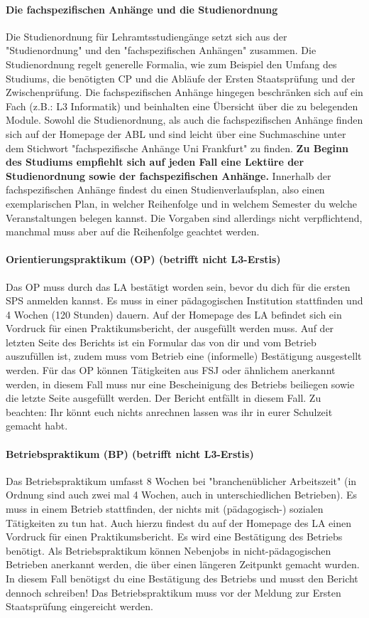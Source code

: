 \paragraph{Die fachspezifischen Anhänge und die Studienordnung}
Die Studienordnung für Lehramtsstudiengänge setzt sich aus der
"Studienordnung" und den "fachspezifischen Anhängen" zusammen. Die Studienordnung regelt generelle Formalia, wie zum Beispiel den Umfang des Studiums, die benötigten CP und die Abläufe der Ersten Staatsprüfung und der Zwischenprüfung.
Die fachspezifischen Anhänge hingegen beschränken sich auf ein Fach (z.B.: L3 Informatik) und beinhalten eine Übersicht über die zu belegenden Module.
Sowohl die Studienordnung, als auch die fachspezifischen Anhänge finden sich auf der Homepage der ABL und sind leicht über eine Suchmaschine unter dem Stichwort "fachspezifische Anhänge Uni Frankfurt" zu finden.
\textbf{Zu Beginn des Studiums empfiehlt sich auf jeden Fall eine Lektüre der Studienordnung sowie der fachspezifischen Anhänge.}
Innerhalb der fachspezifischen Anhänge findest du einen Studienverlaufsplan, also einen exemplarischen Plan, in welcher Reihenfolge und in welchem Semester du welche Veranstaltungen belegen kannst. Die Vorgaben sind allerdings nicht verpflichtend, manchmal muss aber auf die Reihenfolge geachtet werden.

\paragraph{Orientierungspraktikum (OP) (betrifft nicht L3-Erstis)} 
Das OP muss durch das LA bestätigt worden sein, bevor du dich für die ersten SPS anmelden kannst. Es muss in einer pädagogischen Institution stattfinden und 4 Wochen (120 Stunden) dauern. Auf der Homepage des LA befindet sich ein Vordruck für einen Praktikumsbericht, der ausgefüllt werden muss. Auf der letzten Seite des Berichts ist ein Formular das von dir und vom Betrieb auszufüllen ist, zudem muss vom Betrieb eine (informelle) Bestätigung ausgestellt werden.
Für das OP können Tätigkeiten aus FSJ oder ähnlichem anerkannt werden, in diesem Fall muss nur eine Bescheinigung des Betriebs beiliegen sowie die letzte Seite ausgefüllt werden. Der Bericht entfällt in diesem Fall.
Zu beachten: Ihr könnt euch nichts anrechnen lassen was ihr in eurer Schulzeit gemacht habt.

\paragraph{Betriebspraktikum (BP) (betrifft nicht L3-Erstis)}
Das Betriebspraktikum umfasst 8 Wochen bei "branchenüblicher Arbeitszeit" (in Ordnung sind auch zwei mal 4 Wochen, auch in unterschiedlichen Betrieben). Es muss in einem Betrieb stattfinden, der nichts mit (pädagogisch-) sozialen Tätigkeiten zu tun hat. Auch hierzu findest du auf der Homepage des LA einen Vordruck für einen Praktikumsbericht. Es wird eine Bestätigung des Betriebs benötigt.
Als Betriebspraktikum können Nebenjobs in nicht-pädagogischen Betrieben anerkannt werden, die über einen längeren Zeitpunkt gemacht wurden. In diesem Fall benötigst du eine Bestätigung des Betriebs und musst den Bericht dennoch schreiben!
Das Betriebspraktikum muss vor der Meldung zur Ersten Staatsprüfung eingereicht werden.
\spaltenende
